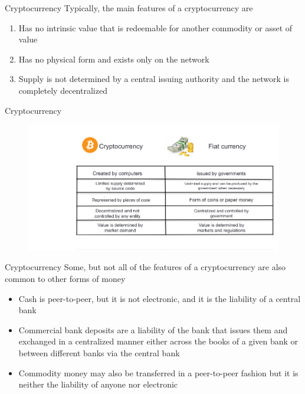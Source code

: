 \documentclass[11pt]{beamer}
\begin{document}
\begin{frame}{Cryptocurrency}
	Typically, the main features of a cryptocurrency are
	\begin{enumerate}
		\item Has no intrinsic value that is redeemable for another commodity or asset of value
		\item Has no physical form and exists only on the network
		\item Supply is not determined by a central issuing authority and the network is completely decentralized
	\end{enumerate}
\end{frame}


\begin{frame}{Cryptocurrency}
	\begin{figure}[]
		\centering
		\includegraphics  [scale=0.3]{Images/cryptovsfiat}
	\end{figure}
\end{frame}


\begin{frame}{Cryptocurrency}
	Some, but not all of the features of a cryptocurrency are also common to other forms of money
	\begin{itemize}
		\item Cash is peer-to-peer, but it is not electronic, and it is the liability of a central bank
		\item Commercial bank deposits are a liability of the bank that issues them and exchanged in a centralized manner either across the books of a given bank or between different banks via the central bank
		\item Commodity money may also be transferred in a peer-to-peer fashion but it is neither the liability of anyone nor electronic
	\end{itemize}
\end{frame}
\end{document}
